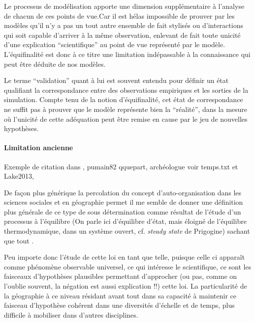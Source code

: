 {Le processus de modélisation apporte une dimension supplémentaire à l'analyse de chacun de ces points de vue.Car il est hélas impossible de prouver par les modèles qu'il n'y a pas un tout autre ensemble de fait stylisés ou d'interactions qui soit capable d'arriver à la même observation, enlevant de fait toute unicité d’une explication \enquote{scientifique} au point de vue représenté par le modèle. L'équifinalité est donc à ce titre une limitation indépassable à la connaissance qui peut être déduite de nos modèles.

Le terme \enquote{validation} quant à lui est souvent entendu pour définir un état qualifiant la correspondance entre des observations empiriques et les sorties de la simulation. Compte tenu de la notion d'équifinalité, cet état de correspondance ne suffit pas à prouver que le modèle représente bien la \enquote{réalité}, dans la mesure où l’unicité de  cette adéquation peut être remise en cause par le jeu de nouvelles hypothèses. 

\paragraph{Limitation ancienne}
Exemple de citation dans \textcite[192]{Sheps1971}, pumain82 qquepart, archéologue voir temps.txt et Lake2013, 

De façon plus générique la percolation du concept d'auto-organisation dans les sciences sociales et en géographie permet il me semble de donner une définition plus générale de ce type de sous détermination comme résultat de l'étude d'un processus à l'équilibre (On parle ici d'équilibre d'état, mais éloigné de l'équilibre thermodynamique, dans un système ouvert, cf. \textit{steady state} de Prigogine) sachant que tout . 

Peu importe donc l'étude de cette loi en tant que telle, puisque celle ci apparaît comme phénomène observable universel, ce qui intéresse le scientifique, ce sont les faisceaux d'hypothèses plausibles permettant d'approcher (ou pas, comme on l'oublie souvent, la négation est aussi explication !!) cette loi. La particularité de la géographie à ce niveau résidant avant tout dans sa capacité à maintenir ce faisceau d'hypothèse cohérent dans une diversités d'échelle et de temps, plus difficile à mobiliser dans d'autres disciplines.

}
